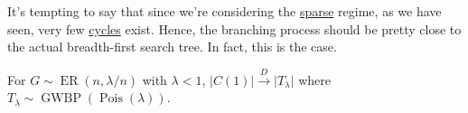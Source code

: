 It's tempting to say that since we're considering the \hyperref[def:sparse-graph]{sparse} regime, as we have seen, very few \hyperref[def:cycle]{cycles} exist. Hence, the branching process should be pretty close to the actual breadth-first search tree. In fact, this is the case.

\begin{theorem}\label{thm:Erdős-Rényi-Galton-Watson}
	For \(G \sim \operatorname{ER}(n, \lambda / n) \) with \(\lambda < 1\), \(\lvert C(1) \rvert \overset{D}{\to} \lvert T_\lambda  \rvert \) where \(T_\lambda \sim \operatorname{GWBP}(\operatorname{Pois}(\lambda ) )\).
\end{theorem}